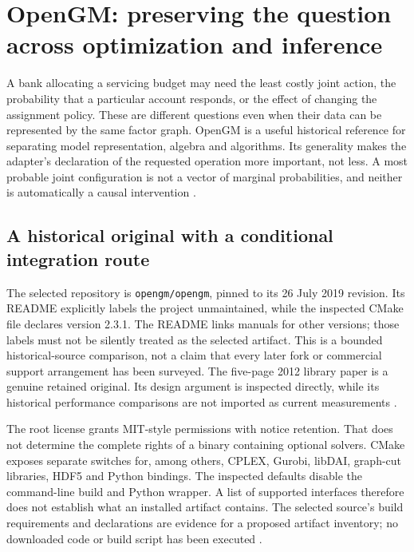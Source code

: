 \section{OpenGM: preserving the question across optimization and inference}
\label{sec:exec24-opengm-reuse}

A bank allocating a servicing budget may need the least costly joint action,
the probability that a particular account responds, or the effect of changing
the assignment policy. These are different questions even when their data
can be represented by the same factor graph. OpenGM is a useful historical
reference for separating model representation, algebra and algorithms. Its
generality makes the adapter's declaration of the requested operation more
important, not less. A most probable joint configuration is not a vector of
marginal probabilities, and neither is automatically a causal intervention
\cite{exec24_opengm_paper,exec24_opengm_source,exec24_opengm_choice}.

\subsection{A historical original with a conditional integration route}
The selected repository is \texttt{opengm/opengm}, pinned to its 26 July
2019 revision. Its README explicitly labels the project unmaintained, while
the inspected CMake file declares version 2.3.1. The README links manuals
for other versions; those labels must not be silently treated as the
selected artifact. This is a bounded historical-source comparison, not a
claim that every later fork or commercial support arrangement has been
surveyed. The five-page 2012 library paper is a genuine retained original.
Its design argument is inspected directly, while its historical performance
comparisons are not imported as current measurements
\cite{exec24_opengm_paper,exec24_opengm_source}.

The root license grants MIT-style permissions with notice retention. That
does not determine the complete rights of a binary containing optional
solvers. CMake exposes separate switches for, among others, CPLEX, Gurobi,
libDAI, graph-cut libraries, HDF5 and Python bindings. The inspected defaults
disable the command-line build and Python wrapper. A list of supported
interfaces therefore does not establish what an installed artifact contains.
The selected source's build requirements and declarations are evidence for
a proposed artifact inventory; no downloaded code or build script has been
executed \cite{exec24_opengm_source}.

